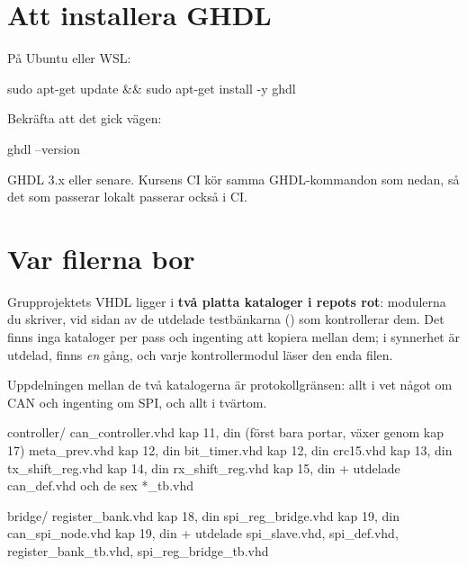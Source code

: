 \section{Att installera GHDL}
\label{app:sim:install}

På Ubuntu eller WSL:

\begin{shell}
sudo apt-get update && sudo apt-get install -y ghdl
\end{shell}

Bekräfta att det gick vägen:

\begin{shell}
ghdl --version
\end{shell}

GHDL 3.x eller senare. Kursens CI kör samma GHDL-kommandon som nedan, så det som passerar lokalt
passerar också i CI.

\section{Var filerna bor}
\label{app:sim:layout}

Grupprojektets VHDL ligger i \textbf{två platta kataloger i repots rot}: modulerna du skriver, vid
sidan av de utdelade testbänkarna () som kontrollerar dem. Det finns inga kataloger
per pass och ingenting att kopiera mellan dem;  i synnerhet är utdelad,
finns \emph{en} gång, och varje kontrollermodul läser den enda filen.

Uppdelningen mellan de två katalogerna är protokollgränsen: allt i  vet något om
CAN och ingenting om SPI, och allt i  tvärtom.

\begin{textdrawing}
controller/   can_controller.vhd     kap 11, din (först bara portar, växer genom kap 17)
              meta_prev.vhd          kap 12, din
              bit_timer.vhd          kap 12, din
              crc15.vhd              kap 13, din
              tx_shift_reg.vhd       kap 14, din
              rx_shift_reg.vhd       kap 15, din
              + utdelade can_def.vhd och de sex *_tb.vhd

bridge/       register_bank.vhd      kap 18, din
              spi_reg_bridge.vhd     kap 19, din
              can_spi_node.vhd       kap 19, din
              + utdelade spi_slave.vhd, spi_def.vhd,
                register_bank_tb.vhd, spi_reg_bridge_tb.vhd
\end{textdrawing}

